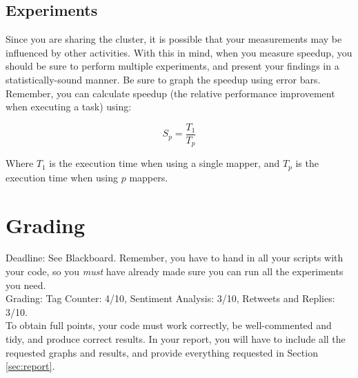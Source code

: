 \documentclass[a4paper,10pt]{article}
\begin{document}
  
  \subsection{Experiments}
  Since you are sharing the cluster, it is possible that your measurements may be influenced by other activities.
  With this in mind, when you measure speedup, you should be sure to perform multiple experiments, and present your findings in a statistically-sound manner.
  Be sure to graph the speedup using error bars.
  Remember, you can calculate speedup (the relative performance improvement when executing a task) using:
  
  \[
  S_p = \frac{T_1}{T_p}
  \]
  
  Where $T_1$ is the execution time when using a single mapper, and $T_p$ is the execution time when using $p$ mappers.
  
  \section{Grading}
  Deadline: See Blackboard. Remember, you have to hand in all your scripts with your code, so you \emph{must} have already made sure you can run all the experiments you need.\\
  Grading: Tag Counter: 4/10, Sentiment Analysis: 3/10, Retweets and Replies: 3/10. \\
  To obtain full points, your code must work correctly, be well-commented and tidy, and produce correct results. In your report, you will have to include all the requested graphs and results, and provide everything requested in Section \ref{sec:report}.
\end{document}
